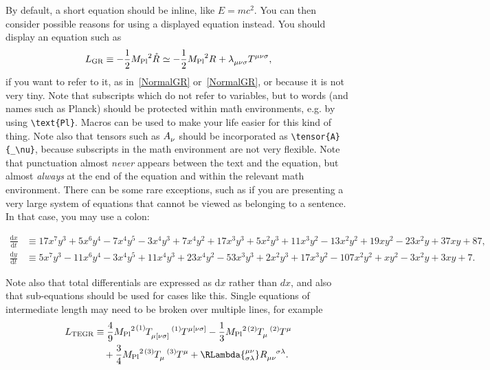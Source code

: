 \documentclass[aps,prd,reprint,preprintnumbers,showpacs,floatfix,nofootinbib,superscript address]{revtex4-2}
\begin{document}
By default, a short equation should be inline, like $E=mc^2$. You can then consider possible reasons for using a displayed equation instead. You should display an equation such as 
\begin{equation}\label{NormalGR}
L_{\text{GR}}\equiv-\frac{1}{2}\Planck^2\rR{}\simeq-\frac{1}{2}\Planck^2\rcR{}
	+\TLambda{_{\mu\nu\sigma}}\T{^{\mu\nu\sigma}},
\end{equation}
if you want to refer to it, as in~\eqref{NormalGR} or~\cref{NormalGR}, or because it is not very tiny. Note that subscripts which do not refer to variables, but to words (and names such as Planck) should be protected within math environments, e.g. by using \texttt{\textbackslash text\{Pl\}}. Macros can be used to make your life easier for this kind of thing. Note also that tensors such as $\tensor{A}{_\nu}$ should be incorporated as \texttt{\textbackslash tensor\{A\}\{\_\textbackslash nu\}}, because subscripts in the math environment are not very flexible. Note that punctuation almost \emph{never} appears between the text and the equation, but almost \emph{always} at the end of the equation and within the relevant math environment. There can be some rare exceptions, such as if you are presenting a very large system of equations that cannot be viewed as belonging to a sentence. In that case, you may use a colon:
\begin{widetext}
\begin{subequations}
\begin{align}\label{BigSystem}
	\frac{\mathrm{d}x}{\mathrm{d}t}&\equiv 17x^7y^3+5x^6y^4-7x^4y^5-3x^4y^3+7x^4y^2+17x^3y^3+5x^2y^3+11x^3y^2-13x^2y^2+19xy^2-23x^2y+37xy+87,\\
	\frac{\mathrm{d}y}{\mathrm{d}t}&\equiv 5x^7y^3-11x^6y^4-3x^4y^5+11x^4y^3+23x^4y^2-53x^3y^3+2x^2y^3+17x^3y^2-107x^2y^2+xy^2-3x^2y+3xy+7.
\end{align}
\end{subequations}
\end{widetext}
Note also that total differentials are expressed as $\mathrm{d}x$ rather than $dx$, and also that sub-equations should be used for cases like this. Single equations of intermediate length may need to be broken over multiple lines, for example
\begin{equation}\label{TEGR}
	\begin{aligned}
		L_{\text{TEGR}}&\equiv
		\frac{4}{9}\Planck^2\T[1]{_{\mu[\nu\sigma]}}\T[1]{^{\mu[\nu\sigma]}}
		-\frac{1}{3}\Planck^2\T[2]{_{\mu}}\T[2]{^{\mu}}
		\\&\ \ \
		+\frac{3}{4}\Planck^2\T[3]{_{\mu}}\T[3]{^{\mu}}
	+\RLambda{^{\mu\nu}_{\sigma\lambda}}\rcR{_{\mu\nu}^{\sigma\lambda}}.
	\end{aligned}
\end{equation}
\end{document}
